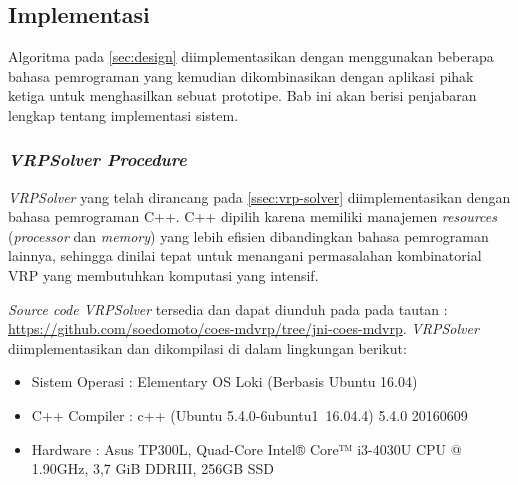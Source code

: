\chapter{\babLima}


\newcommand\MyHead[2]{%
	\multicolumn{1}{l}{\parbox{#1}{\centering #2}}
}


\section{Implementasi}
\label{sec:implementation}
Algoritma pada \autoref{sec:design} diimplementasikan dengan menggunakan beberapa bahasa pemrograman yang kemudian dikombinasikan dengan aplikasi pihak ketiga untuk menghasilkan sebuat prototipe. Bab ini akan berisi penjabaran lengkap tentang implementasi sistem. 


\subsection{\textit{VRPSolver Procedure}}

\textit{VRPSolver} yang telah dirancang pada \autoref{ssec:vrp-solver} diimplementasikan dengan bahasa pemrograman C++. C++ dipilih karena memiliki manajemen \textit{resources} (\textit{processor} dan \textit{memory}) yang lebih efisien dibandingkan bahasa pemrograman lainnya, sehingga dinilai tepat untuk menangani permasalahan kombinatorial VRP yang membutuhkan komputasi yang intensif. 

\textit{Source code VRPSolver} tersedia dan dapat diunduh pada pada tautan : \url{https://github.com/soedomoto/coes-mdvrp/tree/jni-coes-mdvrp}. \textit{VRPSolver} diimplementasikan dan dikompilasi di dalam lingkungan berikut:
\begin{itemize}
	\item Sistem Operasi		: Elementary OS Loki (Berbasis Ubuntu 16.04)
	\item C++ Compiler			: c++ (Ubuntu 5.4.0-6ubuntu1~16.04.4) 5.4.0 20160609
	\item Hardware				: Asus TP300L, Quad-Core Intel® Core™ i3-4030U CPU @ 1.90GHz, 3,7 GiB DDRIII, 256GB SSD
\end{itemize}


